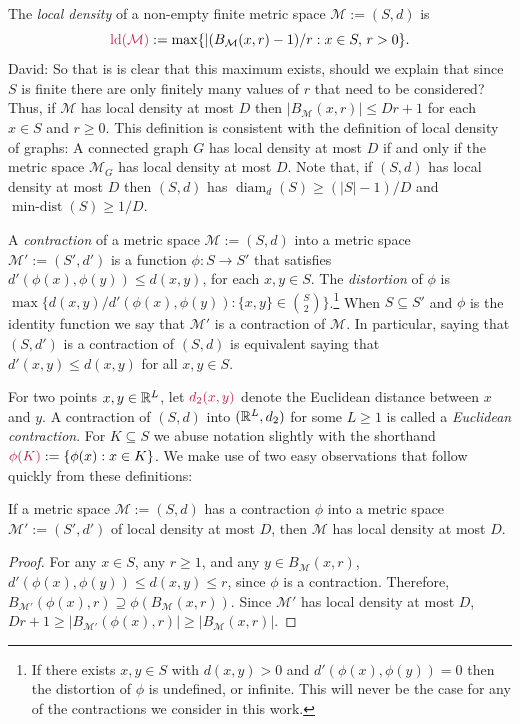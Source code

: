 \documentclass{patmorin}
\makeatletter
\renewcommand{\ge}{\geqslant}
\renewcommand{\le}{\leqslant}
\newcommand{\david}[1]{{\color{orange} David: #1}}
\newcommand{\defin}[1]{\emph{\textcolor{brightmaroon}{#1}}}
\def\mathcolor#1#{\@mathcolor{#1}}
\def\@mathcolor#1#2#3{%
  \protect\leavevmode
  \begingroup
    \color#1{#2}#3%
  \endgroup
}
\newcommand{\mathdefin}[1]{\mathcolor{brightmaroon}{#1}}
\DeclareMathOperator{\diam}{diam}
\DeclareMathOperator{\mindist}{min-dist}
\DeclareMathOperator{\ld}{ld}
\makeatother
\begin{document}
The \defin{local density} of a non-empty finite metric space $\mathcal{M}:=(S,d)$ is $$\mathdefin{\ld(\mathcal{M})}:=\max\{|(B_{\mathcal{M}}(x,r)-1)/r:x\in S,\, r>0\}.$$
\david{So that is is clear that this maximum exists, should we explain that since $S$ is finite there are only finitely many values of $r$ that need to be considered?}
Thus, if $\mathcal{M}$ has local density at most $D$ then $|B_{\mathcal{M}}(x,r)|\le Dr+1$ for each $x\in S$ and $r\ge 0$.
This definition is consistent with the definition of local density of graphs:  A connected graph $G$ has local density at most $D$ if and only if the metric space $\mathcal{M}_G$ has local density at most $D$.  Note that, if $(S,d)$ has local density at most $D$ then $(S,d)$ has $\diam_d(S)\ge (|S|-1)/D$ and $\mindist(S)\ge 1/D$.

A \defin{contraction} of a metric space $\mathcal{M}:=(S,d)$ into a metric space $\mathcal{M'}:=(S',d')$ is a function $\phi:S\to S'$ that satisfies $d'(\phi(x),\phi(y))\le d(x,y)$, for each $x,y\in S$. The \defin{distortion} of $\phi$ is $\max\{d(x,y)/d'(\phi(x),\phi(y)):\{x,y\}\in \binom{S}{2}\}$.\footnote{If there exists $x,y\in S$ with $d(x,y)>0$ and $d'(\phi(x),\phi(y))=0$ then the distortion of $\phi$ is undefined, or infinite. This will never be the case for any of the contractions we consider in this work.}  When $S\subseteq S'$ and $\phi$ is the identity function we say that $\mathcal{M'}$ is a contraction of $\mathcal{M}$. In particular, saying that $(S,d')$ is a contraction of $(S,d)$ is equivalent saying that $d'(x,y)\le d(x,y)$ for all $x,y\in S$.

For two points $x,y\in\mathbb{R}^L$, let $\mathdefin{d_2(x,y)}$ denote the Euclidean distance between $x$ and $y$.  A contraction of $(S,d)$ into $(\mathbb{R}^L, d_2)$ for some $L\ge 1$ is called a \defin{Euclidean contraction}.  For $K\subseteq S$ we abuse notation slightly with the shorthand $\mathdefin{\phi(K)}:=\{\phi(x):x\in K\}$.   We make use of two easy observations that follow quickly from these definitions:

\begin{obs}\label{contraction_increases_density}
  If a metric space $\mathcal{M}:=(S,d)$ has a contraction $\phi$ into a metric space $\mathcal{M}':=(S',d')$ of local density at most $D$, then $\mathcal{M}$ has local density at most $D$.
\end{obs}

\begin{proof}
  For any $x\in S$, any $r\ge 1$, and any $y\in B_\mathcal{M}(x,r)$, $d'(\phi(x),\phi(y))\le d(x,y)\le r$, since $\phi$ is a contraction.  Therefore, $B_{\mathcal{M'}}(\phi(x),r)\supseteq \phi(B_{\mathcal{M}}(x,r))$.  Since $\mathcal{M'}$ has local density at most $D$,  $Dr+1 \ge |B_\mathcal{M'}(\phi(x),r)|\ge |B_{\mathcal{M}}(x,r)|$.
\end{proof}
\end{document}
